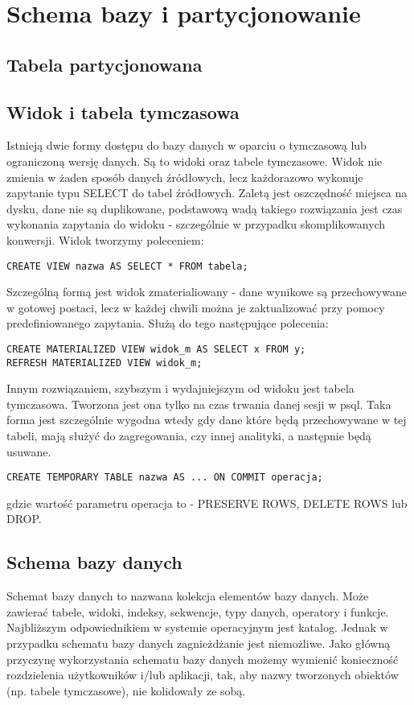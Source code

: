 \chapter{Schema bazy i partycjonowanie}
	\section{Tabela partycjonowana}
	
	\section{Widok i tabela tymczasowa}
	
Istnieją dwie formy dostępu do bazy danych w oparciu o tymczasową lub ograniczoną wersję danych. Są to widoki oraz tabele tymczasowe.
Widok nie zmienia w żaden sposób danych źródłowych, lecz każdorazowo wykonuje zapytanie typu SELECT do tabel źródłowych. Zaletą jest oszczędność miejsca na dysku, dane nie są duplikowane, podstawową wadą takiego rozwiązania jest czas wykonania zapytania do widoku - szczególnie w przypadku skomplikowanych konwersji.
Widok tworzymy poleceniem:
\begin{lstlisting}
CREATE VIEW nazwa AS SELECT * FROM tabela;
\end{lstlisting} 
Szczególną formą jest widok zmaterialiowany - dane wynikowe są przechowywane w gotowej postaci, lecz w każdej chwili można je zaktualizować przy pomocy predefiniowanego zapytania. Służą do tego następujące polecenia:
\begin{lstlisting}
CREATE MATERIALIZED VIEW widok_m AS SELECT x FROM y;
REFRESH MATERIALIZED VIEW widok_m;
\end{lstlisting}
Innym rozwiązaniem, szybszym i wydajniejszym od widoku jest tabela tymczasowa. Tworzona jest ona tylko na czas trwania danej sesji w psql. Taka forma jest szczególnie wygodna wtedy gdy dane które będą przechowywane w tej tabeli, mają służyć do zagregowania, czy innej analityki, a następnie będą usuwane.
\begin{lstlisting}
CREATE TEMPORARY TABLE nazwa AS ... ON COMMIT operacja;
\end{lstlisting}
gdzie wartość parametru operacja to - PRESERVE ROWS, DELETE ROWS lub DROP.
	
	\section{Schema bazy danych}

Schemat bazy danych to nazwana kolekcja elementów bazy danych. Może zawierać tabele, widoki, indeksy, sekwencje, typy danych, operatory i funkcje. Najbliższym odpowiednikiem w systemie operacyjnym jest katalog. Jednak w przypadku schematu bazy danych zagnieżdżanie jest niemożliwe. Jako główną przyczynę wykorzystania schematu bazy danych możemy wymienić konieczność rozdzielenia użytkowników i/lub aplikacji, tak, aby nazwy tworzonych obiektów (np. tabele tymczasowe), nie kolidowały ze sobą.

